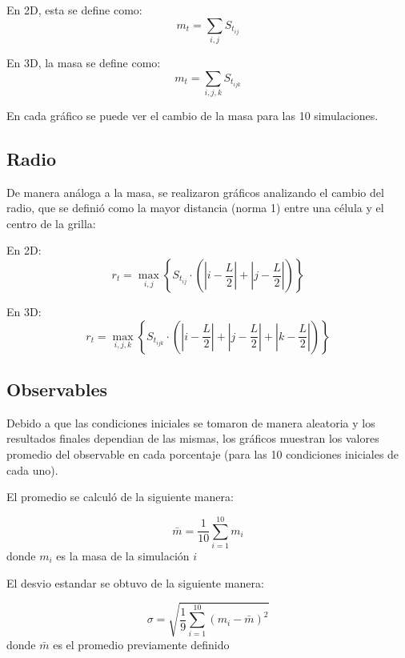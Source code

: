 En 2D, esta se define como:
\begin{equation}
m_t = \sum_{i,j}{S_{t_{ij}}}
\end{equation}

En 3D, la masa se define como:
\begin{equation}
m_t = \sum_{i,j,k}{S_{t_{ijk}}}
\end{equation}

En cada gráfico se puede ver el cambio de la masa para las 10 simulaciones.

\subsection{Radio}
De manera análoga a la masa, se realizaron gráficos analizando el cambio del radio, que se definió como la mayor distancia (norma 1) entre una célula y el centro de la grilla:

En 2D:
\begin{equation}
r_t = \max_{i,j}{\left\{ S_{t_{ij}} \cdot \left( \left| i - \frac{L}{2} \right| + \left| j - \frac{L}{2} \right| \right) \right\}}
\end{equation}


En 3D:
\begin{equation}
r_t = \max_{i,j,k}{\left\{ S_{t_{ijk}} \cdot \left( \left| i - \frac{L}{2} \right| + \left| j - \frac{L}{2} \right| + \left| k - \frac{L}{2} \right| \right) \right\}}
\end{equation}


\subsection{Observables}
Debido a que las condiciones iniciales se tomaron de manera aleatoria y los resultados finales dependian de las mismas, los gráficos muestran los valores promedio del observable en cada porcentaje (para las 10 condiciones iniciales de cada uno).

El promedio se calculó de la siguiente manera:

\begin{equation}
    \label{eq:mean}
    \bar{m} = \frac{1}{10} \sum_{i=1}^{10} m_i
\end{equation}
donde $m_i$ es la masa de la simulación $i$

El desvio estandar se obtuvo de la siguiente manera:

\begin{equation}
    \label{eq:std}
    \sigma = \sqrt{\frac{1}{9} \sum_{i=1}^{10} (m_i - \bar{m})^2}
\end{equation}
donde $\bar{m}$ es el promedio previamente definido


